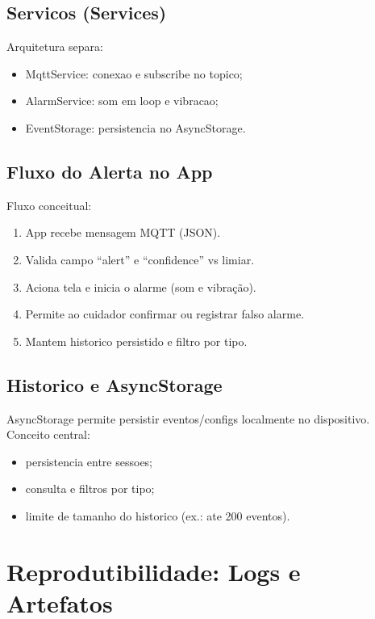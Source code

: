 \subsection{Servicos (Services)}
Arquitetura separa:
\begin{itemize}
  \item MqttService: conexao e subscribe no topico;
  \item AlarmService: som em loop e vibracao;
  \item EventStorage: persistencia no AsyncStorage.
\end{itemize}

\subsection{Fluxo do Alerta no App}
Fluxo conceitual:
\begin{enumerate}
  \item App recebe mensagem MQTT (JSON).
  \item Valida campo ``alert'' e ``confidence'' vs limiar.
  \item Aciona tela e inicia o alarme (som e vibração).
  \item Permite ao cuidador confirmar ou registrar falso alarme.
  \item Mantem historico persistido e filtro por tipo.
\end{enumerate}

\subsection{Historico e AsyncStorage}
AsyncStorage permite persistir eventos/configs localmente no dispositivo. Conceito central:
\begin{itemize}
  \item persistencia entre sessoes;
  \item consulta e filtros por tipo;
  \item limite de tamanho do historico (ex.: ate 200 eventos).
\end{itemize}

\section{Reprodutibilidade: Logs e Artefatos}

